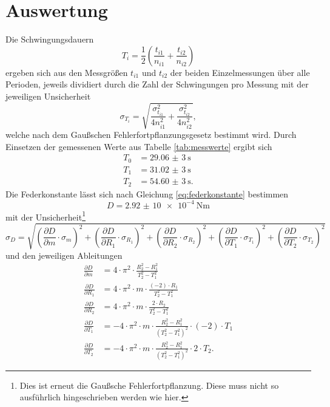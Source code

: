 \section{Auswertung}

Die Schwingungsdauern 
\begin{equation}
    T_i = \frac{1}{2}\left(\frac{t_{i1}}{n_{i1}} + \frac{t_{i2}}{n_{i2}}\right)
\end{equation}
ergeben sich aus den Messgrößen $t_{i1}$ und $t_{i2}$ der beiden Einzelmessungen über alle Perioden, jeweils dividiert durch die Zahl der Schwingungen pro Messung mit der jeweiligen Unsicherheit
\begin{equation}
    \sigma_{T_i} = \sqrt{\frac{\sigma_{t_{i1}}^2}{4 n_{i1}^2} + \frac{\sigma_{t_{i2}}^2}{4 n_{i2}^2}} ,
\end{equation}
welche nach dem Gaußschen Fehlerfortpflanzungsgesetz bestimmt wird.
Durch Einsetzen der gemessenen Werte aus Tabelle \ref{tab:messwerte} ergibt sich
\begin{align*}
    T_0 &= \qty{29,06(3)}{\second} \\
    T_1 &= \qty{31,02(3)}{\second} \\
    T_2 &= \qty{54,60(3)}{\second} .
\end{align*}
Die Federkonstante lässt sich nach Gleichung \eqref{eq:federkonstante} bestimmen
\begin{equation*}
    D = \qty{2,92(10)e-4}{\newton\meter}
\end{equation*}
mit der Unsicherheit\footnote{Dies ist erneut die Gaußsche Fehlerfortpflanzung. Diese muss nicht so ausführlich hingeschrieben werden wie hier.}
\begin{equation*}
    \sigma_D = \sqrt{\left(\frac{\partial D}{\partial m}\cdot \sigma_{m}\right)^2+\left(\frac{\partial D}{\partial R_1}\cdot \sigma_{R_1}\right)^2+\left(\frac{\partial D}{\partial R_2}\cdot \sigma_{R_2}\right)^2+\left(\frac{\partial D}{\partial T_1}\cdot \sigma_{T_1}\right)^2+\left(\frac{\partial D}{\partial T_2}\cdot \sigma_{T_2}\right)^2}
\end{equation*}
und den jeweiligen Ableitungen
\begin{align*}
    \frac{\partial D}{\partial m} &= 4\cdot \pi^2\cdot \frac{R_2^2 - R_1^2}{T_2^2 - T_1^2} \\
    \frac{\partial D}{\partial R_1} &= 4\cdot \pi^2\cdot m\cdot \frac{(-2)\cdot R_1}{T_2^2 - T_1^2} \\
    \frac{\partial D}{\partial R_2} &= 4\cdot \pi^2\cdot m\cdot \frac{2\cdot R_2}{T_2^2 - 
    T_1^2} \\
    \frac{\partial D}{\partial T_1} &= -4\cdot \pi^2\cdot m\cdot \frac{R_2^2 - R_1^2}{(T_2^2-T_1^2)^2}\cdot (-2)\cdot T_1 \\
    \frac{\partial D}{\partial T_2} &= -4\cdot \pi^2\cdot m\cdot \frac{R_2^2 - R_1^2}{(T_2^2 - T_1^2)^2}\cdot 2\cdot T_2 .
\end{align*}
